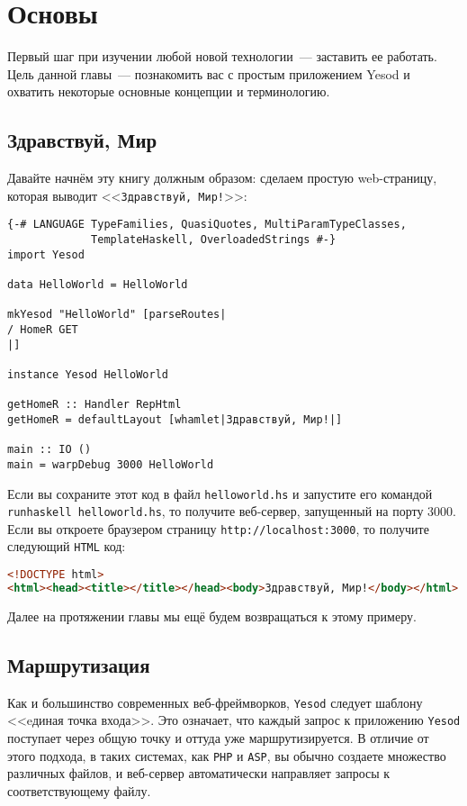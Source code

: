 \chapter{Основы}\label{ch:basics}

Первый шаг при изучении любой новой технологии~--- заставить ее работать. Цель данной
главы~--- познакомить вас с простым приложением Yesod и охватить некоторые основные
концепции и терминологию.

\section{Здравствуй, Мир}

Давайте начнём эту книгу должным образом: сделаем простую web-страницу, которая выводит
<<\texttt{Здравствуй, Мир!}>>:

\begin{lstlisting}
{-# LANGUAGE TypeFamilies, QuasiQuotes, MultiParamTypeClasses,
             TemplateHaskell, OverloadedStrings #-}
import Yesod

data HelloWorld = HelloWorld

mkYesod "HelloWorld" [parseRoutes|
/ HomeR GET
|]

instance Yesod HelloWorld

getHomeR :: Handler RepHtml
getHomeR = defaultLayout [whamlet|Здравствуй, Мир!|]

main :: IO ()
main = warpDebug 3000 HelloWorld
\end{lstlisting}

Если вы сохраните этот код в файл \lstinline!helloworld.hs! и запустите его командой
\lstinline!runhaskell helloworld.hs!, то получите веб-сервер, запущенный на порту 3000.
Если вы откроете браузером страницу \lstinline'http://localhost:3000', то получите
следующий \texttt{HTML} код:

\begin{lstlisting}[language=HTML]
<!DOCTYPE html>
<html><head><title></title></head><body>Здравствуй, Мир!</body></html>
\end{lstlisting}

Далее на протяжении главы мы ещё будем возвращаться к этому примеру.

\section{Маршрутизация}

Как и большинство современных веб-фреймворков, \texttt{Yesod} следует шаблону <<eдиная
точка входа>>. Это означает, что каждый запрос к приложению \texttt{Yesod} поступает через
общую точку и оттуда уже маршрутизируется. В отличие от этого подхода, в таких системах,
как \texttt{PHP} и \texttt{ASP}, вы обычно создаете множество различных файлов, и
веб-сервер автоматически направляет запросы к соответствующему файлу.

